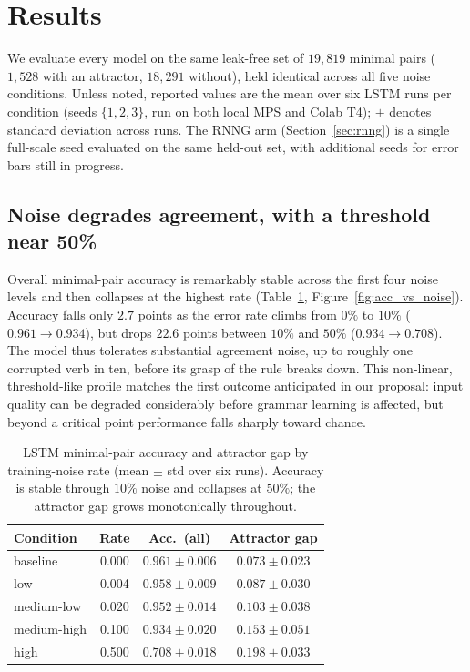 \section{Results}
\label{sec:results}


We evaluate every model on the same leak-free set of $19{,}819$ minimal pairs
($1{,}528$ with an attractor, $18{,}291$ without), held identical across all
five noise conditions. Unless noted, reported values are the mean over six LSTM
runs per condition (seeds $\{1,2,3\}$, run on both local MPS and Colab T4);
$\pm$ denotes standard deviation across runs. The RNNG arm
(Section~\ref{sec:rnng}) is a single full-scale seed evaluated on the same
held-out set, with additional seeds for error bars still in progress.

\subsection{Noise degrades agreement, with a threshold near 50\%}

Overall minimal-pair accuracy is remarkably stable across the first four noise
levels and then collapses at the highest rate (Table~\ref{tab:main},
Figure~\ref{fig:acc_vs_noise}). Accuracy falls only $2.7$ points as the error
rate climbs from $0\%$ to $10\%$ ($0.961 \to 0.934$), but drops $22.6$ points
between $10\%$ and $50\%$ ($0.934 \to 0.708$). The model thus tolerates
substantial agreement noise, up to roughly one corrupted verb in ten, before
its grasp of the rule breaks down. This non-linear, threshold-like profile
matches the first outcome anticipated in our proposal: input quality can be
degraded considerably before grammar learning is affected, but beyond a critical
point performance falls sharply toward chance.

\begin{table}[t]
  \centering
  \small
  \begin{tabular}{lccc}
    \toprule
    Condition & Rate & Acc.\ (all) & Attractor gap \\
    \midrule
    baseline     & 0.000 & $0.961 \pm 0.006$ & $0.073 \pm 0.023$ \\
    low          & 0.004 & $0.958 \pm 0.009$ & $0.087 \pm 0.030$ \\
    medium-low   & 0.020 & $0.952 \pm 0.014$ & $0.103 \pm 0.038$ \\
    medium-high  & 0.100 & $0.934 \pm 0.020$ & $0.153 \pm 0.051$ \\
    high         & 0.500 & $0.708 \pm 0.018$ & $0.198 \pm 0.033$ \\
    \bottomrule
  \end{tabular}
  \caption{LSTM minimal-pair accuracy and attractor gap by training-noise rate
    (mean $\pm$ std over six runs). Accuracy is stable through $10\%$ noise and
    collapses at $50\%$; the attractor gap grows monotonically throughout.}
  \label{tab:main}
\end{table}

